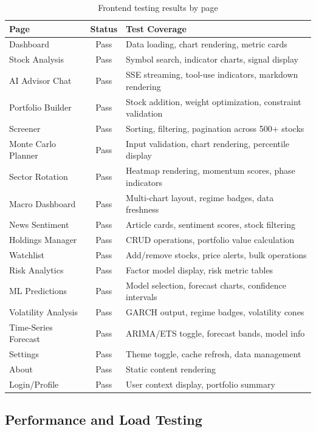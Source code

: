 \documentclass[12pt, a4paper, oneside]{report}
\begin{document}
\begin{table}[H]
\centering
\caption{Frontend testing results by page}
\label{tab:frontend_testing}
\begin{tabularx}{\textwidth}{@{}l c X@{}}
\toprule
\textbf{Page} & \textbf{Status} & \textbf{Test Coverage} \\
\midrule
Dashboard & Pass & Data loading, chart rendering, metric cards \\
Stock Analysis & Pass & Symbol search, indicator charts, signal display \\
AI Advisor Chat & Pass & SSE streaming, tool-use indicators, markdown rendering \\
Portfolio Builder & Pass & Stock addition, weight optimization, constraint validation \\
Screener & Pass & Sorting, filtering, pagination across 500+ stocks \\
Monte Carlo Planner & Pass & Input validation, chart rendering, percentile display \\
Sector Rotation & Pass & Heatmap rendering, momentum scores, phase indicators \\
Macro Dashboard & Pass & Multi-chart layout, regime badges, data freshness \\
News Sentiment & Pass & Article cards, sentiment scores, stock filtering \\
Holdings Manager & Pass & CRUD operations, portfolio value calculation \\
Watchlist & Pass & Add/remove stocks, price alerts, bulk operations \\
Risk Analytics & Pass & Factor model display, risk metric tables \\
ML Predictions & Pass & Model selection, forecast charts, confidence intervals \\
Volatility Analysis & Pass & GARCH output, regime badges, volatility cones \\
Time-Series Forecast & Pass & ARIMA/ETS toggle, forecast bands, model info \\
Settings & Pass & Theme toggle, cache refresh, data management \\
About & Pass & Static content rendering \\
Login/Profile & Pass & User context display, portfolio summary \\
\bottomrule
\end{tabularx}
\end{table}

\subsection{Performance and Load Testing}
\end{document}
